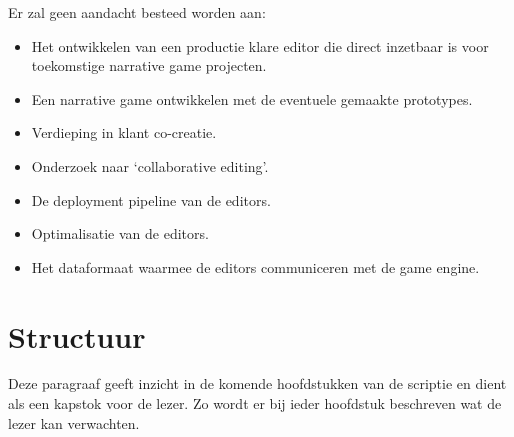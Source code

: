 \noindent Er zal geen aandacht besteed worden aan:
\begin{itemize}
    \item Het ontwikkelen van een productie klare editor die direct inzetbaar is voor toekomstige narrative game projecten.
    \item Een narrative game ontwikkelen met de eventuele gemaakte prototypes.
    \item Verdieping in klant co-creatie.
    \item Onderzoek naar ‘collaborative editing’.
    \item De deployment pipeline van de editors.
    \item Optimalisatie van de editors.
    \item Het dataformaat waarmee de editors communiceren met de game engine.
\end{itemize}

\section{Structuur}
Deze paragraaf geeft inzicht in de komende hoofdstukken van de scriptie en dient als een kapstok voor de lezer. Zo wordt er bij ieder hoofdstuk beschreven wat de lezer kan verwachten.

